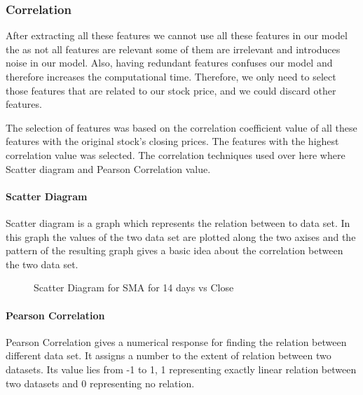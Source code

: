 \documentclass[5p,,preprint,12pt,twocolumn]{elsarticle}
\makeatletter
\def\fixFloatSize#1{}%
\makeatother
\begin{document}
\subsubsection{Correlation}After extracting all these features we cannot use all these features in our model the as not all features are relevant some of them are irrelevant and introduces noise in our model. Also, having redundant features confuses our model and therefore increases the computational time. Therefore, we only need to select those features that are related to our stock price, and we could discard other features. 

The selection of features was based on the correlation coefficient value of all these features with the original stock's closing prices. The features with the highest correlation value was selected. The correlation techniques used over here where Scatter diagram and Pearson Correlation value. 



\paragraph{Scatter Diagram \mbox{}\protect\newline }Scatter diagram is a graph which represents the relation between to data set. In this graph the values of the two data set are plotted along the two axises and the pattern of the resulting graph gives a basic idea about the correlation between the two data set.


\bgroup
\fixFloatSize{images/a22461c6-231b-45aa-8c38-b0eae2e5e733-uscatter-diagram-ma14-days.png}
\begin{figure}[!htbp]
\centering \makeatletter{}
\makeatother 
\caption{{Scatter Diagram for SMA for 14 days vs Close}}
\label{f-17b8b0e26c01}
\end{figure}
\egroup




\paragraph{Pearson Correlation}Pearson Correlation gives a numerical response for finding the relation between different data set. It assigns a number to the extent of relation between two datasets. Its value lies from -1 to 1, 1 representing exactly linear relation between two datasets and 0 representing no relation.
\end{document}
